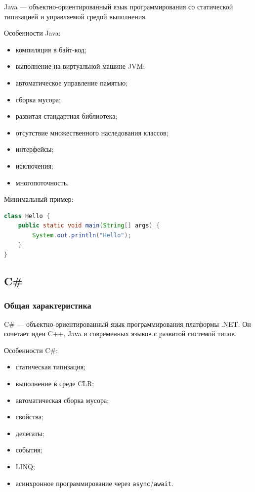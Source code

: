 \documentclass[12pt,a4paper]{article}
\begin{document}
Java --- объектно-ориентированный язык программирования со статической типизацией и управляемой средой выполнения.

Особенности Java:
\begin{itemize}
    \item компиляция в байт-код;
    \item выполнение на виртуальной машине JVM;
    \item автоматическое управление памятью;
    \item сборка мусора;
    \item развитая стандартная библиотека;
    \item отсутствие множественного наследования классов;
    \item интерфейсы;
    \item исключения;
    \item многопоточность.
\end{itemize}

Минимальный пример:
\begin{lstlisting}[language=Java]
class Hello {
    public static void main(String[] args) {
        System.out.println("Hello");
    }
}
\end{lstlisting}

\subsection{C\#}

\subsubsection{Общая характеристика}

C\# --- объектно-ориентированный язык программирования платформы .NET. Он сочетает идеи C++, Java и современных языков с развитой системой типов.

Особенности C\#:
\begin{itemize}
    \item статическая типизация;
    \item выполнение в среде CLR;
    \item автоматическая сборка мусора;
    \item свойства;
    \item делегаты;
    \item события;
    \item LINQ;
    \item асинхронное программирование через \texttt{async}/\texttt{await}.
\end{itemize}
\end{document}
